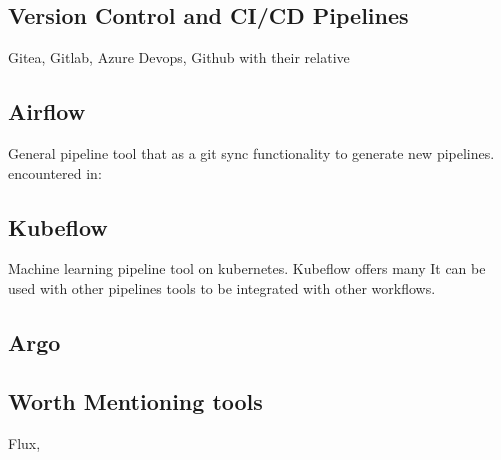\subsection{Version Control and CI/CD Pipelines}
Gitea, Gitlab, Azure Devops, Github with their relative
\subsection{Airflow}
General pipeline tool that as a git sync functionality to generate new pipelines.
encountered in:
\subsection{Kubeflow}
Machine learning pipeline tool on kubernetes.
Kubeflow offers many
It can be used with other pipelines tools to be integrated with other workflows.

\cite{inproceedings} \cite{10855428}

\subsection{Argo}


\subsection{Worth Mentioning tools}
Flux,